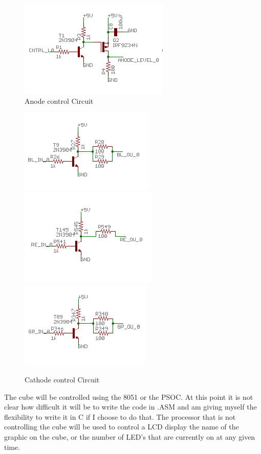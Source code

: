 \documentclass[11pt]{article} %
\begin{document}
\begin{figure}[!htb]
\caption{Anode control Circuit}
\includegraphics[scale=.75]{anode}
\centering
\end{figure}

\begin{figure}[!htb]
\caption{Cathode control Circuit}
\centering
\includegraphics[scale=.5]{blue}
\includegraphics[scale=.5]{red}
\includegraphics[scale=.5]{green}
\end{figure}

The cube will be controlled using the 8051 or the PSOC. At this point it is not clear how difficult it will be to write the code in .ASM and am giving myself the flexibility to write it in C if I choose to do that. The processor that is not controlling the cube will be used to control a LCD display the name of the graphic on the cube, or the number of LED's that are currently on at any given time. 
\end{document}
